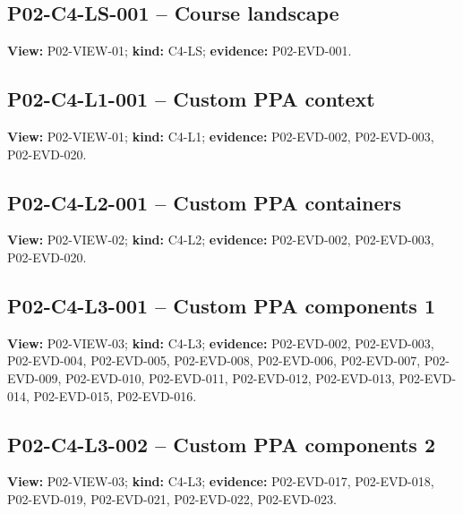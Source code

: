 \documentclass[10pt,letterpaper]{article}
\begin{document}
\subsection{P02-C4-LS-001 -- Course landscape}
\textbf{View:} P02-VIEW-01; \textbf{kind:} C4-LS; \textbf{evidence:} P02-EVD-001.\par
{}
\clearpage

\subsection{P02-C4-L1-001 -- Custom PPA context}
\textbf{View:} P02-VIEW-01; \textbf{kind:} C4-L1; \textbf{evidence:} P02-EVD-002, P02-EVD-003, P02-EVD-020.\par
{}
\clearpage

\subsection{P02-C4-L2-001 -- Custom PPA containers}
\textbf{View:} P02-VIEW-02; \textbf{kind:} C4-L2; \textbf{evidence:} P02-EVD-002, P02-EVD-003, P02-EVD-020.\par
{}
\clearpage

\subsection{P02-C4-L3-001 -- Custom PPA components 1}
\textbf{View:} P02-VIEW-03; \textbf{kind:} C4-L3; \textbf{evidence:} P02-EVD-002, P02-EVD-003, P02-EVD-004, P02-EVD-005, P02-EVD-008, P02-EVD-006, P02-EVD-007, P02-EVD-009, P02-EVD-010, P02-EVD-011, P02-EVD-012, P02-EVD-013, P02-EVD-014, P02-EVD-015, P02-EVD-016.\par
{}
\clearpage

\subsection{P02-C4-L3-002 -- Custom PPA components 2}
\textbf{View:} P02-VIEW-03; \textbf{kind:} C4-L3; \textbf{evidence:} P02-EVD-017, P02-EVD-018, P02-EVD-019, P02-EVD-021, P02-EVD-022, P02-EVD-023.\par
{}
\clearpage
\end{document}
